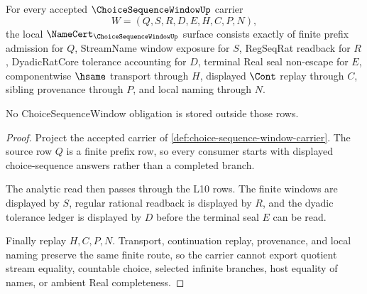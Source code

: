 \begin{theorem}
\label{thm:choice-sequence-window-namecert-obligations}
For every accepted $\ChoiceSequenceWindowUp$ carrier
$$
W=(Q,S,R,D,E,H,C,P,N),
$$
the local $\NameCert_{\ChoiceSequenceWindowUp}$ surface consists exactly of finite prefix admission for $Q$, StreamName window exposure for $S$, RegSeqRat readback for $R$, DyadicRatCore tolerance accounting for $D$, terminal Real seal non-escape for $E$, componentwise $\hsame$ transport through $H$, displayed $\Cont$ replay through $C$, sibling provenance through $P$, and local naming through $N$.

No ChoiceSequenceWindow obligation is stored outside those rows.
\end{theorem}
\begin{proof}
Project the accepted carrier of \autoref{def:choice-sequence-window-carrier}. The source row $Q$ is a finite prefix row, so every consumer starts with displayed choice-sequence answers rather than a completed branch.

The analytic read then passes through the L10 rows. The finite windows are displayed by $S$, regular rational readback is displayed by $R$, and the dyadic tolerance ledger is displayed by $D$ before the terminal seal $E$ can be read.

Finally replay $H,C,P,N$. Transport, continuation replay, provenance, and local naming preserve the same finite route, so the carrier cannot export quotient stream equality, countable choice, selected infinite branches, host equality of names, or ambient Real completeness.
\end{proof}


